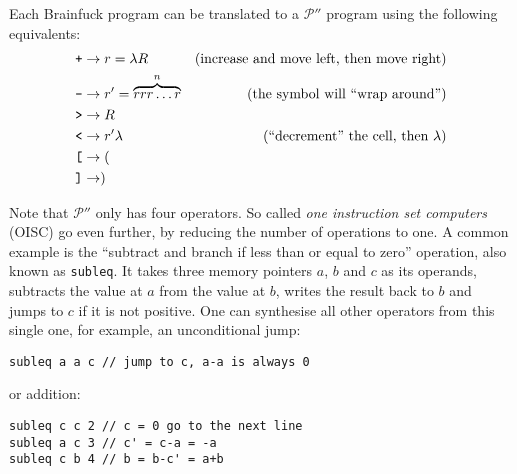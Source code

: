 Each Brainfuck program can be translated  to a $\mathcal{P}''$ program using the following equivalents:
\begin{align*}
    \text{\texttt{+}} &\rightarrow r = \lambda R &\text{(increase and move left, then move right)}\\
    \text{\texttt{-}} &\rightarrow r' = \overbrace{rrr\dots r}^n &\text{(the symbol will “wrap around”)}\\
    \text{\texttt{>}} &\rightarrow R\\
    \text{\texttt{<}} &\rightarrow r'\lambda &\text{(“decrement” the cell, then $\lambda$)}\\
    \text{\texttt{[}} &\rightarrow (\\
    \text{\texttt{]}} &\rightarrow )
\end{align*}

Note that $\mathcal{P}''$ only has four operators. So called \emph{one instruction set computers} (OISC) go even further, by reducing the number of operations to one. A common example is the “subtract and branch if less than or equal to zero” operation, also known as \texttt{subleq}. It takes three memory pointers $a$, $b$ and $c$ as its operands, subtracts the value at $a$ from the value at $b$, writes the result back to $b$ and jumps to $c$ if it is not positive. One can synthesise all other operators from this single one, for example, an unconditional jump:

\begin{lstlisting}
subleq a a c // jump to c, a-a is always 0
\end{lstlisting}

or addition:

\begin{lstlisting}
subleq c c 2 // c = 0 go to the next line
subleq a c 3 // c' = c-a = -a
subleq c b 4 // b = b-c' = a+b
\end{lstlisting}

